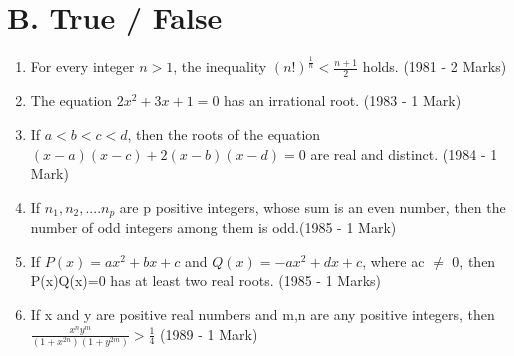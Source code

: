 \documentclass[journal,12pt,twocolumn]{IEEEtran}
\theoremstyle{remark}
\begin{document}
\section*{B. True / False}
\begin{enumerate}
    \item For every integer $n>1$, the inequality $(n!)^\frac{1}{n} < \frac{n+1}{2}$ holds. \hfill (1981 - 2 Marks)
    \item The equation $2x^2 + 3x + 1 = 0$ has an irrational root. \hfill (1983 - 1 Mark)
    \item If $a<b<c<d$, then the roots of the equation $(x-a)(x-c)+2(x-b)(x-d)=0$ are real and distinct. \hfill (1984 - 1 Mark)
    \item If $n_1, n_2, ....n_p$ are p positive integers, whose sum is an even number, then the number of odd integers among them is odd.\hfill (1985 - 1 Mark)
    \item If $P(x) = ax^2+bx+c$ and $Q(x)= -ax^2+dx+c$, where ac $\neq$ 0, then P(x)Q(x)=0 has at least two real roots. \hfill(1985 - 1 Marks)
    \item If x and y are positive real numbers and m,n are any positive integers, then $\frac{x^ny^m}{(1+ x^{2n})(1+ y^{2m})} > \frac{1}{4}$ \hfill (1989 - 1 Mark)
\end{enumerate}
\renewcommand{\thefigure}{\theenumi}
\renewcommand{\thetable}{\theenumi}
\end{document}
